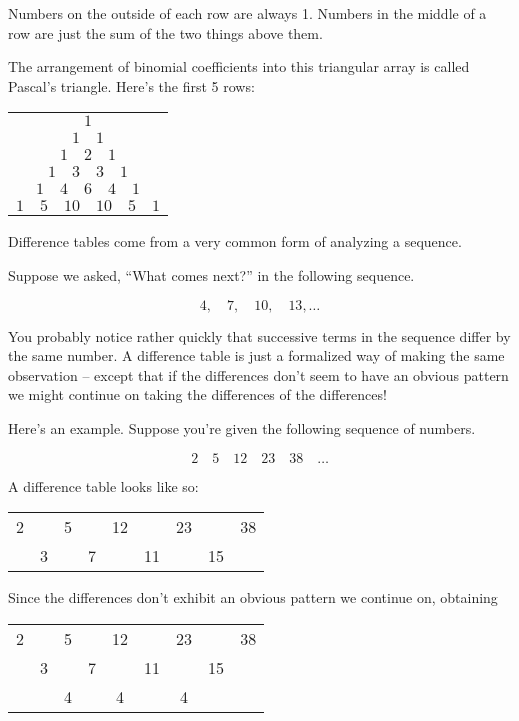  Numbers on the outside of each row are always 1.  Numbers in the middle of a row are just the sum of the two things above them.
 
 The arrangement of binomial coefficients into this triangular array is called Pascal's triangle.  Here's the first 5 rows:
 
 \begin{tabular}{c}
 	$1$ \\
 	$1 \quad 1$ \\
 	$1 \quad 2 \quad 1$ \\
 	$1 \quad 3 \quad 3 \quad 1$\\
 	$1 \quad 4 \quad 6 \quad 4 \quad 1$\\
 	$1 \quad 5 \quad 10 \quad 10 \quad 5 \quad 1$\\
 \end{tabular}
 
 Difference tables come from a very common form of analyzing a sequence.
 
 Suppose we asked, ``What comes next?'' in the following sequence.
 
 \[ 4, \quad 7, \quad 10, \quad 13, \ldots \]
 
 You probably notice rather quickly that successive terms in the sequence differ by the same number.  A difference table is just a formalized way of making the same observation -- except that if the differences don't seem to have an obvious pattern we might continue on taking the differences of the differences!
 
 Here's an example.  Suppose you're given the following sequence of numbers.
 
 \[ 2 \quad 5 \quad 12 \quad 23 \quad 38 \quad \ldots \]
 
 A difference table looks like so:
 
 \begin{tabular}{ccccccccc}
 	2 &  & 5 & & 12 & & 23 & & 38 \\
 	   & 3 & & 7 & & 11 & & 15 
 \end{tabular}

Since the differences don't exhibit an obvious pattern we continue on, obtaining

\begin{tabular}{ccccccccc}
	2 &  & 5 & & 12 & & 23 & & 38 \\
	& 3 & & 7 & & 11 & & 15 & \\
	& & 4 &  & 4  &  & 4 & & \\ 
\end{tabular}

